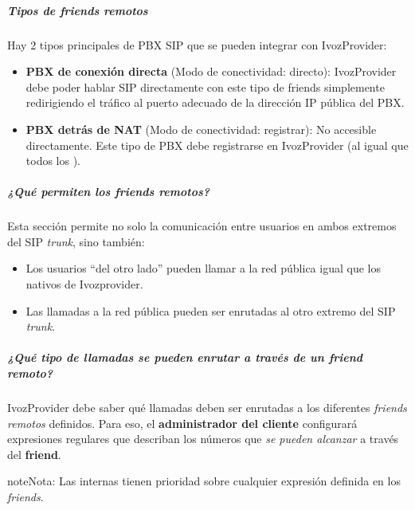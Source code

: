 \documentclass[letterpaper,10pt,spanish]{sphinxmanual}
\begin{document}
\subparagraph{Tipos de friends remotos}
\label{administration_portal/client/vpbx/routing_endpoints/friends/remote_friends:types-of-remote-friends}
Hay 2 tipos principales de PBX SIP que se pueden integrar con IvozProvider:
\begin{itemize}
\item {} 
\textbf{PBX de conexión directa} (Modo de conectividad: directo): IvozProvider debe poder hablar SIP directamente con este tipo de friends simplemente redirigiendo el tráfico al puerto adecuado de la dirección IP pública del PBX.

\item {} 
\textbf{PBX detrás de NAT} (Modo de conectividad: registrar): No accesible directamente. Este tipo de PBX debe registrarse en IvozProvider (al igual que todos los {\hyperref[administration_portal/client/vpbx/terminals:terminals]{}}).

\end{itemize}


\subparagraph{¿Qué permiten los friends remotos?}
\label{administration_portal/client/vpbx/routing_endpoints/friends/remote_friends:what-do-remote-friends-allow}
Esta sección permite no solo la comunicación entre usuarios en ambos extremos del SIP \emph{trunk}, sino también:
\begin{itemize}
\item {} 
Los usuarios ``del otro lado'' pueden llamar a la red pública igual que los {\hyperref[administration_portal/client/vpbx/users:users]{}} nativos de Ivozprovider.

\item {} 
Las llamadas a la red pública pueden ser enrutadas al otro extremo del SIP \emph{trunk}.

\end{itemize}


\subparagraph{¿Qué tipo de llamadas se pueden enrutar a través de un \emph{friend remoto}?}
\label{administration_portal/client/vpbx/routing_endpoints/friends/remote_friends:what-kind-of-calls-can-be-routed-through-a-remote-friend}
IvozProvider debe saber qué llamadas deben ser enrutadas a los diferentes \emph{friends remotos} definidos. Para eso, el \textbf{administrador del cliente} configurará expresiones regulares que describan los números que \emph{se pueden alcanzar} a través del \textbf{friend}.

\begin{notice}{note}{Nota:}
Las {\hyperref[administration_portal/client/vpbx/extensions:extensions]{}} internas tienen prioridad sobre cualquier expresión definida en los \emph{friends}.
\end{notice}
\end{document}
